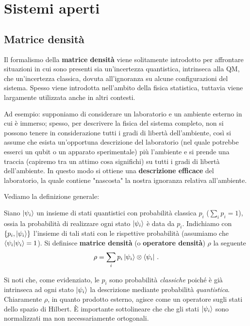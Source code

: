 \chapter{Sistemi aperti}

\section{Matrice densità}
Il formalismo della \textbf{matrice densità} viene solitamente introdotto per affrontare situazioni in cui sono presenti sia un'incertezza quantistica, intrinseca alla QM, che un'incertezza classica, dovuta all'ignoranza su alcune configurazioni del sistema. Spesso viene introdotta nell'ambito della fisica statistica, tuttavia viene largamente utilizzata anche in altri contesti. 

\noindent Ad esempio: supponiamo di considerare un laboratorio e un ambiente esterno in cui è immerso; spesso, per descrivere la fisica del sistema completo, non si possono tenere in considerazione tutti i gradi di libertà dell'ambiente, così si assume che esista un'opportuna descrizione del laboratorio (nel quale potrebbe esserci un qubit o un apparato sperimentale) più l'ambiente e si prende una traccia (capiremo tra un attimo cosa significhi) su tutti i gradi di libertà dell'ambiente. In questo modo si ottiene una \textbf{descrizione efficace} del laboratorio, la quale contiene "nascosta" la nostra ignoranza relativa all'ambiente. 

\noindent Vediamo la definizione generale:

\begin{definizione}
    Siano $\ket{\psi_i}$ un insieme di stati quantistici con probabilità classica $p_i$ ($\sum_i p_i = 1$), ossia la probabilità di realizzare ogni stato $\ket{\psi_i}$ è data da $p_i$. Indichiamo con $\{ p_i, \ket{\psi_i} \}$ l'insieme di tali stati con le rispettive probabilità (assumiamo che $\braket{\psi_i} = 1$). Si definisce \textbf{matrice densità} (o \textbf{operatore densità}) $\rho$ la seguente
    \begin{equation}\label{density_matrix}
        \rho = \sum_i p_i \ket{\psi_i} \otimes \bra{\psi_i} \, .
    \end{equation}
\end{definizione}

\noindent Si noti che, come evidenziato, le $p_i$ sono probabilità \textit{classiche} poiché è già intrinseca ad ogni stato $\ket{\psi_i}$ la descrizione mediante probabilità \textit{quantistica}. Chiaramente $\rho$, in quanto prodotto esterno, agisce come un operatore sugli stati dello spazio di Hilbert. È importante sottolineare che che gli stati $\ket{\psi_i}$ sono normalizzati ma non necessariamente ortogonali. 

